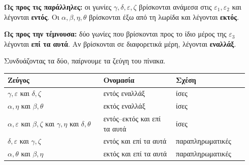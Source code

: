\begin{center}
\end{center}

\textbf{Ως προς τις παράλληλες:} οι γωνίες $\gamma,\delta,\varepsilon,\zeta$ βρίσκονται ανάμεσα στις $\varepsilon_1,\varepsilon_2$ και λέγονται \textbf{εντός}. Οι $\alpha,\beta,\eta,\theta$ βρίσκονται έξω από τη λωρίδα και λέγονται \textbf{εκτός}.

\textbf{Ως προς την τέμνουσα:} δύο γωνίες που βρίσκονται προς το ίδιο μέρος της $\varepsilon_3$ λέγονται \textbf{επί τα αυτά}. Αν βρίσκονται σε διαφορετικά μέρη, λέγονται \textbf{εναλλάξ}.

Συνδυάζοντας τα δύο, παίρνουμε τα ζεύγη του πίνακα.

\begin{center}
\renewcommand{\arraystretch}{1.25}
\begin{tabular}{@{}p{0.37\linewidth}p{0.29\linewidth}p{0.28\linewidth}@{}}
\toprule
Ζεύγος & Ονομασία & Σχέση\\
\midrule
$\gamma,\varepsilon$ και $\delta,\zeta$ & εντός εναλλάξ & ίσες\\
$\alpha,\eta$ και $\beta,\theta$ & εκτός εναλλάξ & ίσες\\
$\alpha,\varepsilon$ και $\beta,\zeta$ και $\gamma,\eta$ και $\delta,\theta$ & εντός--εκτός και επί τα αυτά & ίσες\\
$\delta,\varepsilon$ και $\gamma,\zeta$ & εντός και επί τα αυτά & παραπληρωματικές\\
$\alpha,\theta$ και $\beta,\eta$ & εκτός και επί τα αυτά & παραπληρωματικές\\
\bottomrule
\end{tabular}
\end{center}

